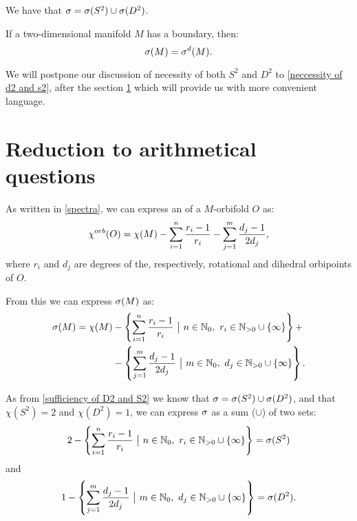 
\begin{corollary}
We have that ${\sigma} = {{\sigma}(S^2)} \cup {{\sigma}(D^2)}$.
\end{corollary}

\begin{observation}\label{only dihedral} 
If a two-dimensional manifold $M$ has a boundary, then:
\begin{equation}
{{\sigma}(M)} = {\sigma}^{d}(M).
\end{equation}
\end{observation}

We will postpone our discussion of necessity of both $S^2$ and $D^2$ to 
\ref{neccessity of d2 and s2}, after 
the 
section \ref{Reduction to arithmetical questions section} which will provide us 
with more convenient language. 

\section{Reduction to arithmetical questions}\label{Reduction to arithmetical questions section}
As written in \ref{spectra}, we can express an \Eoc of a $M$-orbifold $O$ as:
\begin{equation}
{\chi^{orb}(O)} = \chi (M) - \sum_{i=1}^n \frac{r_i-1}{r_i} - \sum_{j=1}^m \frac{d_j-1}{2d_j},
\end{equation}
where $r_i$ and $d_j$ are degrees of the, respectively, rotational and dihedral orbipoints 
of $O$.

From this we can express ${{\sigma}(M)}$ as:
\begin{align}
\spe(M) = \chi (M) &-\left\{\sum\limits_{i=1}^n \frac{r_i-1}{r_i}\ \big|\ n\in\mathbb{N}_0,\ 
r_i\in\mathbb{N}_{>0}\cup \{\infty\}\right\}+ \\
&- \left\{\sum\limits_{j=1}^m\frac{d_j-1}{2d_j}\ 
\big|\ m\in\mathbb{N}_0,\ d_j\in\mathbb{N}_{>0}\cup \{\infty\}\right\} .
\end{align}

As from \ref{sufficiency of D2 and S2} we know that ${\sigma} = {{\sigma}(S^2)} \cup {{\sigma}(D^2)}$, and that 
$\chi (S^2) = 2$ and $\chi (D^2) = 1$, we can express ${\sigma}$ as a sum ($\cup$) of two sets:
\begin{equation}
2 -\left\{\sum\limits_{i=1}^n \frac{r_i-1}{r_i}\ \big|\ n\in\mathbb{N}_0,\ 
r_i\in\mathbb{N}_{>0}\cup \{\infty\}\right\} = \spe(S^2)
\end{equation}
and
\begin{equation}
1 - \left\{\sum\limits_{j=1}^m\frac{d_j-1}{2d_j}\ 
\big|\ m\in\mathbb{N}_0,\ d_j\in\mathbb{N}_{>0}\cup \{\infty\}\right\} = \spe(D^2) .
\end{equation}

